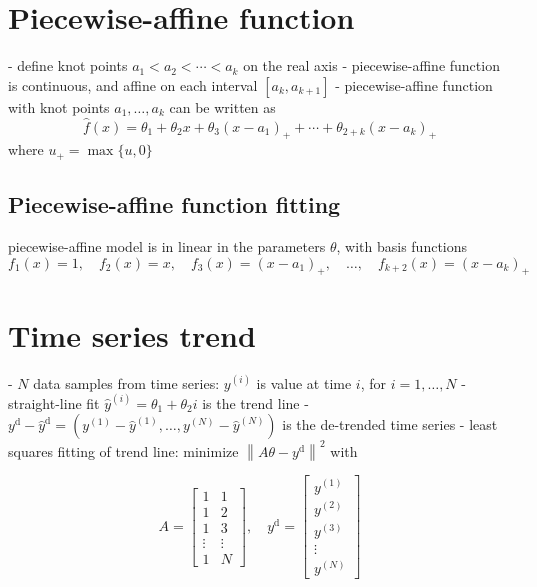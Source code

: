 \section{Piecewise-affine function}

- define knot points $ a_{1}<a_{2}<\cdots<a_{k} $ on the real axis
- piecewise-affine function is continuous, and affine on each interval $ \left[a_{k}, a_{k+1}\right] $
- piecewise-affine function with knot points $ a_{1}, \ldots, a_{k} $ can be written as
$$
\hat{f}(x)=\theta_{1}+\theta_{2} x+\theta_{3}\left(x-a_{1}\right)_{+}+\cdots+\theta_{2+k}\left(x-a_{k}\right)_{+}
$$
where $ u_{+}=\max \{u, 0\} $

\subsection{Piecewise-affine function fitting}

piecewise-affine model is in linear in the parameters $ \theta $, with basis functions
$$
f_{1}(x)=1, \quad f_{2}(x)=x, \quad f_{3}(x)=\left(x-a_{1}\right)_{+}, \quad \ldots, \quad f_{k+2}(x)=\left(x-a_{k}\right)_{+}
$$

\section{Time series trend}

- $ N $ data samples from time series: $ y^{(i)} $ is value at time $ i $, for $ i=1, \ldots, N $
- straight-line fit $ \hat{y}^{(i)}=\theta_{1}+\theta_{2} i $ is the trend line
- $ y^{\mathrm{d}}-\hat{y}^{\mathrm{d}}=\left(y^{(1)}-\hat{y}^{(1)}, \ldots, y^{(N)}-\hat{y}^{(N)}\right) $ is the de-trended time series
- least squares fitting of trend line: minimize $ \left\|A \theta-y^{\mathrm{d}}\right\|^{2} $ with

$$ A=\left[\begin{array}{cc}1 & 1 \\ 1 & 2 \\ 1 & 3 \\ \vdots & \vdots \\ 1 & N\end{array}\right], \quad y^{\mathrm{d}}=\left[\begin{array}{c}y^{(1)} \\ y^{(2)} \\ y^{(3)} \\ \vdots \\ y^{(N)}\end{array}\right] $$


